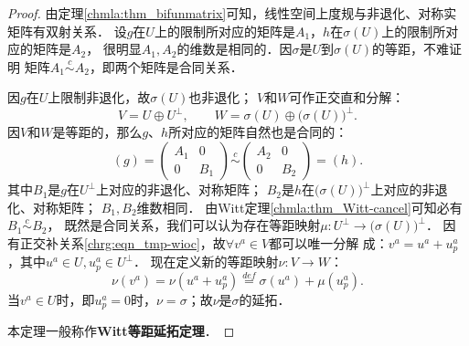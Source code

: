 \begin{proof}
    由定理\ref{chmla:thm_bifunmatrix}可知，线性空间上度规与非退化、对称实矩阵有双射关系．
    设$g$在$U$上的限制所对应的矩阵是$A_1$，$h$在$\sigma(U)$上的限制所对应的矩阵是$A_2$，
    很明显$A_1,A_2$的维数是相同的．因$\sigma$是$U$到$\sigma(U)$的等距，不难证明
    矩阵$A_1\overset{c}{\sim} A_2$，即两个矩阵是合同关系．
    
    因$g$在$U$上限制非退化，故$\sigma(U)$也非退化；
    $V$和$W$可作正交直和分解：
    \begin{equation}\label{chrg:eqn_tmp-wioc}
        V = U \oplus U^\perp, \qquad
        W = \sigma(U) \oplus \bigl(\sigma(U)\bigr)^\perp .
    \end{equation}   
    因$V$和$W$是等距的，那么$g$、$h$所对应的矩阵自然也是合同的：
    \begin{equation}
        (g)=\begin{pmatrix}  A_1 &0 \\ 0 & B_1  \end{pmatrix} \overset{c}{\sim}
        \begin{pmatrix}  A_2 &0 \\ 0 & B_2  \end{pmatrix} =(h) .
    \end{equation}
    其中$B_1$是$g$在$U^\perp$上对应的非退化、对称矩阵；
    $B_2$是$h$在$\bigl(\sigma(U)\bigr)^\perp$上对应的非退化、对称矩阵；
    $B_1,B_2$维数相同．
    由Witt定理\ref{chmla:thm_Witt-cancel}可知必有$B_1 \overset{c}{\sim} B_2$，
    既然是合同关系，我们可以认为存在等距映射$\mu:U^\perp \to \bigl(\sigma(U)\bigr)^\perp$．
    因有正交补关系\eqref{chrg:eqn_tmp-wioc}，故$\forall v^a\in V$都可以唯一分解
    成：$v^a = u^a + u_p^a$，其中$u^a\in U, u_p^a \in U^\perp$．
    现在定义新的等距映射$\nu:V\to W$：
    \begin{equation}
        \nu (v^a)= \nu(u^a + u_p^a) \overset{def}{=}  \sigma(u^a) + \mu(u_p^a) .
    \end{equation}
    当$v^a\in U$时，即$u_p^a=0$时，$\nu=\sigma$；故$\nu$是$\sigma$的延拓．
    
    本定理一般称作{\bfseries \heiti Witt等距延拓定理}．
\end{proof}

